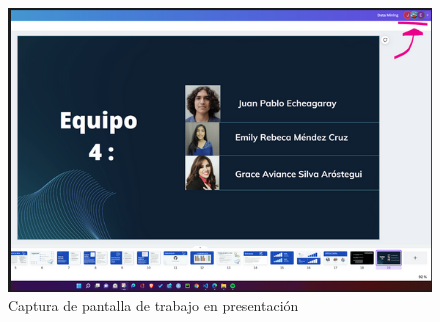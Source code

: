 \documentclass[journal]{IEEEtran}                                                          %
\begin{document}
        \begin{figure}[!htb]
            \centering
            \includegraphics[scale=0.5]{../report/img/evidence-presentation.png}
            \caption{Captura de pantalla de trabajo en presentación}
            \label{evidence-presentation}
        \end{figure}

    
    
\end{document}
